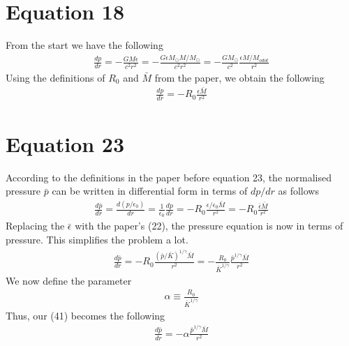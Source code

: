 \documentclass{article}
\begin{document}
\section*{Equation 18}
From the start we have the following
\begin{align}
    \frac{dp}{dr}=-\frac{GM\epsilon}{c^2r^2}=-\frac{G\epsilon M_{\odot}M/M_{\odot}}{c^2r^2}=-\frac{GM_{\odot}}{c^2}\frac{\epsilon M/M_{odot}}{r^2}
\end{align}
Using the definitions of $R_0$ and $\bar{M}$ from the paper, we obtain the following 
\begin{align}
    \boxed{\frac{dp}{dr}=-R_0\frac{\epsilon\bar{M}}{r^2}}
\end{align}
\section*{Equation 23}
According to the definitions in the paper before equation 23, the normalised pressure $\bar{p}$ can be written in 
differential form in terms of $dp/dr$ as follows 
\begin{align}
    \frac{d\bar{p}}{dr}=\frac{d(p/\epsilon_0)}{dr}=\frac{1}{\epsilon_0}\frac{dp}{dr}=-R_0\frac{\epsilon/\epsilon_0\bar{M}}{r^2}=-R_0\frac{\bar{\epsilon}\bar{M}}{r^2}
\end{align}
Replacing the $\bar{\epsilon}$ with the paper's (22), the pressure equation is now in terms of pressure. This simplifies the problem a lot.
\begin{align}
    \frac{d\bar{p}}{dr}=-R_0\frac{(\bar{p}/\bar{K})^{1/\gamma}\bar{M}}{r^2}=-\frac{R_0}{\bar{K}^{1/\gamma}}\frac{\bar{p}^{1/\gamma}\bar{M}}{r^2}
\end{align}
We now define the parameter 
\begin{align}
    \alpha\equiv\frac{R_0}{\bar{K}^{1/\gamma}}
\end{align}
Thus, our (41) becomes the following  
\begin{align}
    \boxed{\frac{d\bar{p}}{dr}=-\alpha\frac{\bar{p}^{1/\gamma}\bar{M}}{r^2}}
\end{align}
\end{document}
